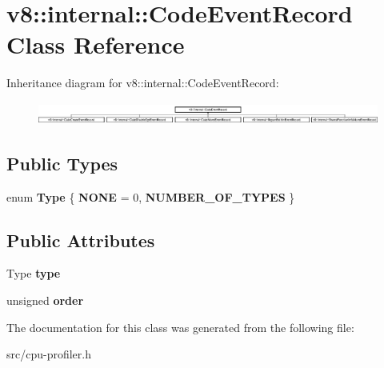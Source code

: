 \hypertarget{classv8_1_1internal_1_1_code_event_record}{}\section{v8\+:\+:internal\+:\+:Code\+Event\+Record Class Reference}
\label{classv8_1_1internal_1_1_code_event_record}
Inheritance diagram for v8\+:\+:internal\+:\+:Code\+Event\+Record\+:\begin{figure}[H]
\begin{center}
\leavevmode
\includegraphics[height=0.736842cm]{classv8_1_1internal_1_1_code_event_record}
\end{center}
\end{figure}
\subsection*{Public Types}
\begin{DoxyCompactItemize}
\item 
\hypertarget{classv8_1_1internal_1_1_code_event_record_ad95141a659db53d824d82e91f357d7bc}{}enum {\bfseries Type} \{ {\bfseries N\+O\+N\+E} = 0, 
{\bfseries N\+U\+M\+B\+E\+R\+\_\+\+O\+F\+\_\+\+T\+Y\+P\+E\+S}
 \}\label{classv8_1_1internal_1_1_code_event_record_ad95141a659db53d824d82e91f357d7bc}

\end{DoxyCompactItemize}
\subsection*{Public Attributes}
\begin{DoxyCompactItemize}
\item 
\hypertarget{classv8_1_1internal_1_1_code_event_record_a2ef08c576ec1178cdf525e1823b24762}{}Type {\bfseries type}\label{classv8_1_1internal_1_1_code_event_record_a2ef08c576ec1178cdf525e1823b24762}

\item 
\hypertarget{classv8_1_1internal_1_1_code_event_record_aeee2145d3bfcdb0120d2a915839548a0}{}unsigned {\bfseries order}\label{classv8_1_1internal_1_1_code_event_record_aeee2145d3bfcdb0120d2a915839548a0}

\end{DoxyCompactItemize}


The documentation for this class was generated from the following file\+:\begin{DoxyCompactItemize}
\item 
src/cpu-\/profiler.\+h\end{DoxyCompactItemize}
